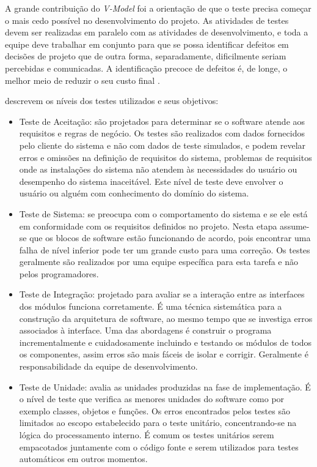 A grande contribuição do \textit{V-Model} foi a orientação de que o teste precisa começar o mais cedo possível no desenvolvimento do projeto. As atividades de testes devem ser realizadas em paralelo com as atividades de desenvolvimento, e toda a equipe deve trabalhar em conjunto para que se possa identificar defeitos em decisões de projeto que de outra forma, separadamente, dificilmente seriam percebidas e comunicadas. A identificação precoce de defeitos é, de longe, o melhor meio de reduzir o seu custo final \cite{ammann2016introduction}.

\cite{graham2008foundations,ammann2016introduction} descrevem os níveis dos testes utilizados e seus objetivos:

\begin{itemize}
\item Teste de Aceitação: são projetados para determinar se o software atende aos requisitos e regras de negócio. Os testes são realizados com dados fornecidos pelo cliente do sistema e não com dados de teste simulados, e podem revelar erros e omissões na definição de requisitos do sistema, problemas de requisitos onde as instalações do sistema não atendem às necessidades do usuário ou desempenho do sistema inaceitável. Este nível de teste deve envolver o usuário ou alguém com conhecimento do domínio do sistema. 
\item Teste de Sistema: se preocupa com o comportamento do sistema e se ele está em conformidade com os requisitos definidos no projeto. Nesta etapa assume-se que os blocos de software estão funcionando de acordo, pois encontrar uma falha de nível inferior pode ter um grande custo para uma correção. Os testes geralmente são realizados por uma equipe específica para esta tarefa e não pelos programadores.
\item Teste de Integração: projetado para avaliar se a interação entre as interfaces dos módulos funciona corretamente. É uma técnica sistemática para a construção da arquitetura de software, ao mesmo tempo que se investiga erros associados à interface. Uma das abordagens é construir o programa incrementalmente e cuidadosamente incluindo e testando os módulos de todos os componentes, assim erros são mais fáceis de isolar e corrigir. Geralmente é responsabilidade da equipe de desenvolvimento.
\item Teste de Unidade: avalia as unidades produzidas na fase de implementação. É o nível de teste que verifica as menores unidades do software como por exemplo classes, objetos e funções. Os erros encontrados pelos testes são limitados ao escopo estabelecido para o teste unitário,  concentrando-se na lógica do processamento interno.  É comum os testes unitários serem empacotados juntamente com o código fonte e serem utilizados para testes automáticos em outros momentos.
\end{itemize}


